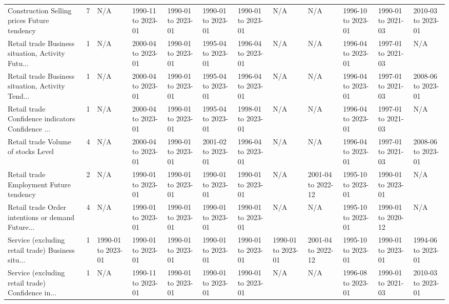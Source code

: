 \begin{table}
\begin{tabular}{@{}llYYYYYYYY@{}}
       Construction Selling prices Future tendency &     7 &                N/A & 1990-11 to 2023-01 & 1990-01 to 2023-01 & 1990-01 to 2023-01 & 1990-01 to 2023-01 &                N/A &                N/A & 1996-10 to 2023-01 & 1990-01 to 2021-03 & 2010-03 to 2023-01 \\
Retail trade  Business situation, Activity Futu... &     1 &                N/A & 2000-04 to 2023-01 & 1990-01 to 2023-01 & 1995-04 to 2023-01 & 1996-04 to 2023-01 &                N/A &                N/A & 1996-04 to 2023-01 & 1997-01 to 2021-03 &                N/A \\
Retail trade  Business situation, Activity Tend... &     1 &                N/A & 2000-04 to 2023-01 & 1990-01 to 2023-01 & 1995-04 to 2023-01 & 1996-04 to 2023-01 &                N/A &                N/A & 1996-04 to 2023-01 & 1997-01 to 2021-03 & 2008-06 to 2023-01 \\
Retail trade  Confidence indicators Confidence ... &     1 &                N/A & 2000-04 to 2023-01 & 1990-01 to 2023-01 & 1995-04 to 2023-01 & 1998-01 to 2023-01 &                N/A &                N/A & 1996-04 to 2023-01 & 1997-01 to 2021-03 &                N/A \\
              Retail trade  Volume of stocks Level &     4 &                N/A & 2000-04 to 2023-01 & 1990-01 to 2023-01 & 2001-02 to 2023-01 & 1996-04 to 2023-01 &                N/A &                N/A & 1996-04 to 2023-01 & 1997-01 to 2021-03 & 2008-06 to 2023-01 \\
          Retail trade  Employment Future tendency &     2 &                N/A & 1990-01 to 2023-01 & 1990-01 to 2023-01 & 1990-01 to 2023-01 & 1990-01 to 2023-01 &                N/A & 2001-04 to 2022-12 & 1995-10 to 2023-01 & 1990-01 to 2023-01 &                N/A \\
Retail trade  Order intentions or demand Future... &     4 &                N/A & 1990-01 to 2023-01 & 1990-01 to 2023-01 & 1990-01 to 2023-01 & 1990-01 to 2023-01 &                N/A &                N/A & 1995-10 to 2023-01 & 1990-01 to 2020-12 &                N/A \\
Service (excluding retail trade)  Business situ... &     1 & 1990-01 to 2023-01 & 1990-01 to 2023-01 & 1990-01 to 2023-01 & 1990-01 to 2023-01 & 1990-01 to 2023-01 & 1990-01 to 2023-01 & 2001-04 to 2022-12 & 1995-10 to 2023-01 & 1990-01 to 2023-01 & 1994-06 to 2023-01 \\
Service (excluding retail trade)  Confidence in... &     1 &                N/A & 1990-11 to 2023-01 & 1990-01 to 2023-01 & 1990-01 to 2023-01 & 1990-01 to 2023-01 &                N/A &                N/A & 1996-08 to 2023-01 & 1990-01 to 2021-03 & 2010-03 to 2023-01 \\

\end{tabular}
\end{table}
